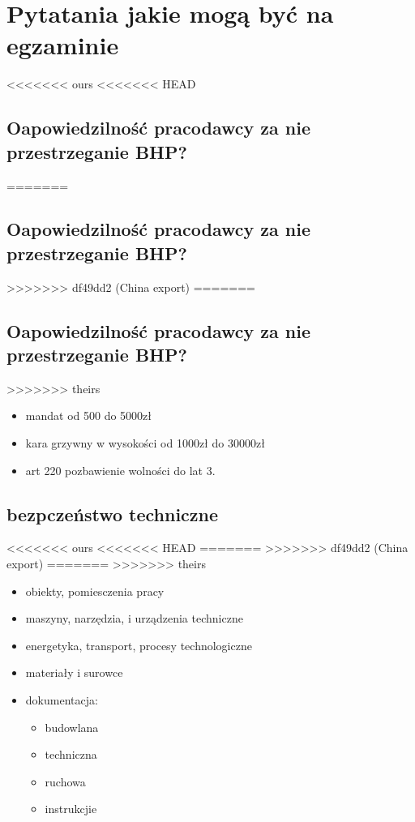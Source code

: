 \documentclass[11pt]{article}
\author{Rafał Grot}
\date{\today}
\title{}
\begin{document}
\tableofcontents

\section{Pytatania jakie mogą być na egzaminie}
<<<<<<< ours
<<<<<<< HEAD
\label{sec:org62dca8d}
\subsection{Oapowiedzilność pracodawcy za nie przestrzeganie BHP?}
\label{sec:org13f6aa8}
=======
\label{sec:org31e3b30}
\subsection{Oapowiedzilność pracodawcy za nie przestrzeganie BHP?}
\label{sec:org7ff5fed}
>>>>>>> df49dd2 (China export)
=======
\label{sec:org31e3b30}
\subsection{Oapowiedzilność pracodawcy za nie przestrzeganie BHP?}
\label{sec:org7ff5fed}
>>>>>>> theirs
\begin{itemize}
\item mandat od 500 do 5000zł
\item kara grzywny w wysokości od 1000zł do 30000zł
\item art 220 pozbawienie wolności do lat 3.
\end{itemize}
\subsection{bezpczeństwo techniczne}
<<<<<<< ours
<<<<<<< HEAD
\label{sec:org49cf96a}
=======
\label{sec:org953c4a8}
>>>>>>> df49dd2 (China export)
=======
\label{sec:org953c4a8}
>>>>>>> theirs
\begin{itemize}
\item obiekty, pomiesczenia pracy
\item maszyny, narzędzia, i urządzenia techniczne
\item energetyka, transport, procesy technologiczne
\item materiały i surowce
\item dokumentacja:
\begin{itemize}
\item budowlana
\item techniczna
\item ruchowa
\item instrukcjie
\end{itemize}
\end{itemize}
\end{document}
